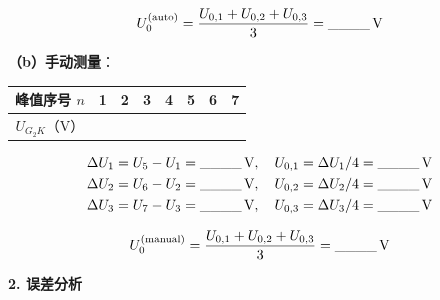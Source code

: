 \documentclass[a4paper,12pt]{article}
\begin{document}
{\[
    U_0^{(\text{auto})} = \frac{U_{0,1} + U_{0,2} + U_{0,3}}{3} = \text{\_\_\_\_}\text{\,V}
\]

\textbf{（b）手动测量}：

\vspace{0.2cm}

\begin{tabular}{c|ccccccc}
    \toprule
    峰值序号 $n$ & 1 & 2 & 3 & 4 & 5 & 6 & 7 \\
    \midrule
    $U_{G_2K}$（V） & & & & & & & \\
    \bottomrule
\end{tabular}

\vspace{0.3cm}

\begin{align}
    \Delta U_1 &= U_5 - U_1 = \text{\_\_\_\_}\text{\,V}, \quad U_{0,1} = \Delta U_1 / 4 = \text{\_\_\_\_}\text{\,V} \notag \\
    \Delta U_2 &= U_6 - U_2 = \text{\_\_\_\_}\text{\,V}, \quad U_{0,2} = \Delta U_2 / 4 = \text{\_\_\_\_}\text{\,V} \notag \\
    \Delta U_3 &= U_7 - U_3 = \text{\_\_\_\_}\text{\,V}, \quad U_{0,3} = \Delta U_3 / 4 = \text{\_\_\_\_}\text{\,V} \notag
\end{align}

\[
    U_0^{(\text{manual})} = \frac{U_{0,1} + U_{0,2} + U_{0,3}}{3} = \text{\_\_\_\_}\text{\,V}
\]

}

\vspace{0.5cm}

{\fontsize{14pt}{20pt}\selectfont \textbf{2. 误差分析}}

\vspace{0.3cm}
\end{document}
